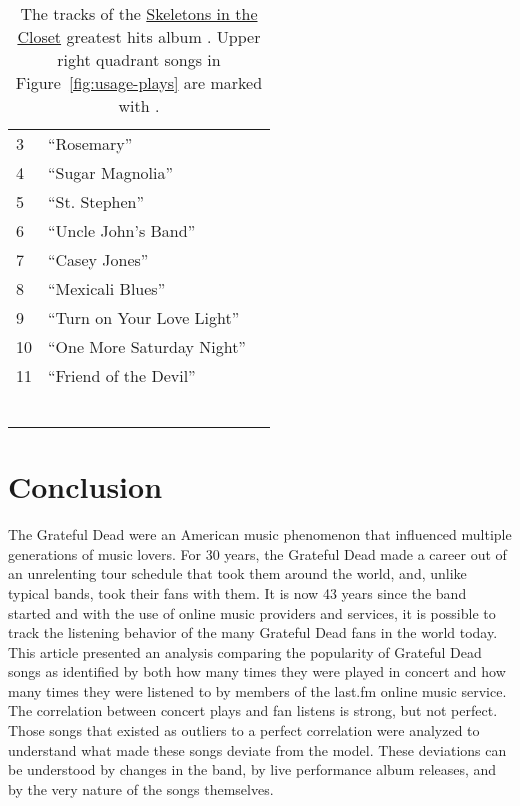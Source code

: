 \documentclass{svmult}
\newcommand{\ttt}[1]{``#1''}
\newcommand{\album}[1]{\uline{#1}}
\begin{document}
\begin{table}
\begin{minipage}{2.75in}
\begin{center}
\begin{footnotesize}
\begin{tabular}{lll}
3&\ttt{Rosemary}\\
4&\ttt{Sugar Magnolia} \\ 	
5&\ttt{St. Stephen}\\
6&\ttt{Uncle John's Band} \\
7&\ttt{Casey Jones} \\
8&\ttt{Mexicali Blues} \\	
9&\ttt{Turn on Your Love Light} \\	
10&\ttt{One More Saturday Night} \\	
11&\ttt{Friend of the Devil} \\
\\ \\ \\ \\ \\ \\
\hline
\end{tabular}
\caption{\label{tab:hits2}The tracks of the \album{Skeletons in the Closet} greatest hits album \cite{skelcloset:dead1974}. Upper right quadrant songs in Figure~\ref{fig:usage-plays} are marked with .}
\end{footnotesize}
\end{center}
    \end{minipage}
\end{table}

\section{Conclusion}

The Grateful Dead were an American music phenomenon that influenced multiple generations of music lovers. For 30 years, the Grateful Dead made a career out of an unrelenting tour schedule that took them around the world, and, unlike typical bands, took their fans with them. It is now 43 years since the band started and with the use of online music providers and services, it is possible to track the listening behavior of the many Grateful Dead fans in the world today. This article presented an analysis comparing the popularity of Grateful Dead songs as identified by both how many times they were played in concert and how many times they were listened to by members of the last.fm online music service. The correlation between concert plays and fan listens is strong, but not perfect. Those songs that existed as outliers to a perfect correlation were analyzed to understand what made these songs deviate from the model. These deviations can be understood by changes in the band, by live performance album releases, and by the very nature of the songs themselves.
\end{document}
